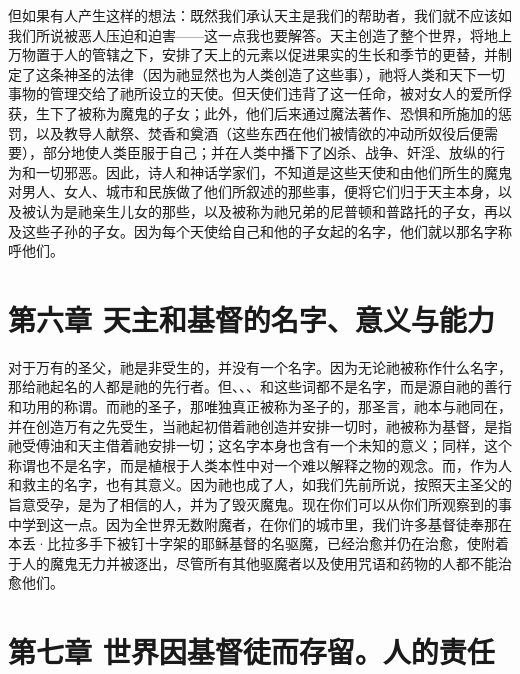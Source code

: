 但如果有人产生这样的想法：既然我们承认天主是我们的帮助者，我们就不应该如我们所说被恶人压迫和迫害——这一点我也要解答。天主创造了整个世界，将地上万物置于人的管辖之下，安排了天上的元素以促进果实的生长和季节的更替，并制定了这条神圣的法律（因为祂显然也为人类创造了这些事），祂将人类和天下一切事物的管理交给了祂所设立的天使。但天使们违背了这一任命，被对女人的爱所俘获，生下了被称为魔鬼的子女；此外，他们后来通过魔法著作、恐惧和所施加的惩罚，以及教导人献祭、焚香和奠酒（这些东西在他们被情欲的冲动所奴役后便需要），部分地使人类臣服于自己；并在人类中播下了凶杀、战争、奸淫、放纵的行为和一切邪恶。因此，诗人和神话学家们，不知道是这些天使和由他们所生的魔鬼对男人、女人、城市和民族做了他们所叙述的那些事，便将它们归于天主本身，以及被认为是祂亲生儿女的那些，以及被称为祂兄弟的尼普顿和普路托的子女，再以及这些子孙的子女。因为每个天使给自己和他的子女起的名字，他们就以那名字称呼他们。\par


\section{第六章 天主和基督的名字、意义与能力}

对于万有的圣父，祂是非受生的，并没有一个名字。因为无论祂被称作什么名字，那给祂起名的人都是祂的先行者。但、、、和这些词都不是名字，而是源自祂的善行和功用的称谓。而祂的圣子，那唯独真正被称为圣子的，那圣言，祂本与祂同在，并在创造万有之先受生，当祂起初借着祂创造并安排一切时，祂被称为基督，是指祂受傅油和天主借着祂安排一切；这名字本身也含有一个未知的意义；同样，这个称谓也不是名字，而是植根于人类本性中对一个难以解释之物的观念。而，作为人和救主的名字，也有其意义。因为祂也成了人，如我们先前所说，按照天主圣父的旨意受孕，是为了相信的人，并为了毁灭魔鬼。现在你们可以从你们所观察到的事中学到这一点。因为全世界无数附魔者，在你们的城市里，我们许多基督徒奉那在本丢·比拉多手下被钉十字架的耶稣基督的名驱魔，已经治愈并仍在治愈，使附着于人的魔鬼无力并被逐出，尽管所有其他驱魔者以及使用咒语和药物的人都不能治愈他们。\par


\section{第七章 世界因基督徒而存留。人的责任}


